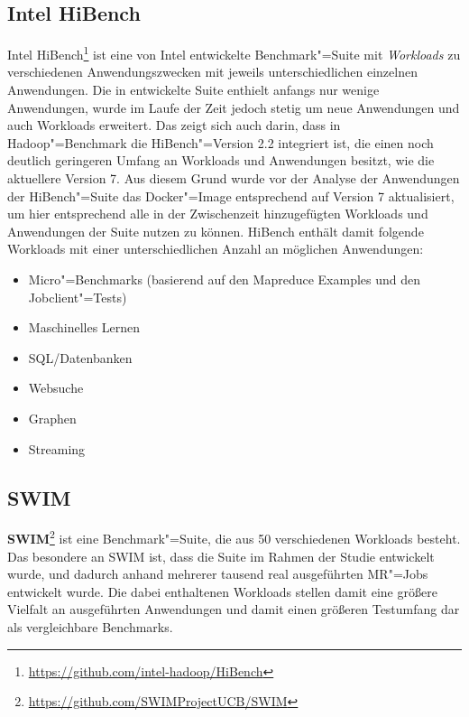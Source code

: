 \subsection{Intel HiBench}
\label{subsec:hibench}

Intel HiBench\footnote{\url{https://github.com/intel-hadoop/HiBench}} ist eine von Intel entwickelte Benchmark"=Suite mit \emph{Workloads} zu verschiedenen Anwendungszwecken mit jeweils unterschiedlichen einzelnen Anwendungen.
Die in \cite{Huang2010} entwickelte Suite enthielt anfangs nur wenige Anwendungen, wurde im Laufe der Zeit jedoch stetig um neue Anwendungen und auch Workloads erweitert.
Das zeigt sich auch darin, dass in Hadoop"=Benchmark die HiBench"=Version \mbox{2.2} integriert ist, die einen noch deutlich geringeren Umfang an Workloads und Anwendungen besitzt, wie \zB die aktuellere Version 7.
Aus diesem Grund wurde vor der Analyse der Anwendungen der HiBench"=Suite das Docker"=Image entsprechend auf Version 7 aktualisiert, um hier entsprechend alle in der Zwischenzeit hinzugefügten Workloads und Anwendungen der Suite nutzen zu können.
HiBench enthält damit folgende Workloads mit einer unterschiedlichen Anzahl an möglichen Anwendungen:

\begin{itemize}
    \item Micro"=Benchmarks (basierend auf den Mapreduce Examples und den Jobclient"=Tests)
    \item Maschinelles Lernen
    \item SQL/Datenbanken
    \item Websuche
    \item Graphen
    \item Streaming
\end{itemize}

\subsection{\acs{SWIM}}
\label{subsec:swim}

\textbf{\ac{SWIM}}\footnote{\url{https://github.com/SWIMProjectUCB/SWIM}} ist eine Benchmark"=Suite, die aus 50 verschiedenen Workloads besteht.
Das besondere an \ac{SWIM} ist, dass die Suite im Rahmen der Studie \cite{Chen2012} entwickelt wurde, und dadurch anhand mehrerer tausend real ausgeführten \ac{MR}"=Jobs entwickelt wurde.
Die dabei enthaltenen Workloads stellen damit eine größere Vielfalt an ausgeführten Anwendungen und damit einen größeren Testumfang dar als vergleichbare Benchmarks\cite{SwimWikiHome}.

